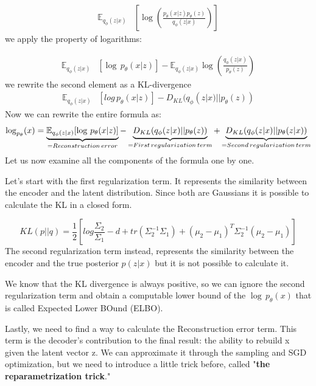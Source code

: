\begin{align*}
\mathbb{E}_{q_\phi (z|x)} & \left[ \log \left( \frac{p_\theta(x|z)p_\theta(z)}{q_\phi(z|x)} \right)\right]
\end{align*}
we apply the property of logarithms:

\begin{align*}
\mathbb{E}_{q_\phi (z|x)} & \left[ \log\,p_\theta(x|z) \right] -  \mathbb{E}_{q_\phi (z|x)} \log \left ( \frac{q_\phi(z|x)}{p_\theta(z)}   \right)
\end{align*}
we rewrite the second element as a KL-divergence
\begin{align*}
\mathbb{E}_{q_\phi (z|x)} & \left[ log\,p_\theta(x|z) \right] - D_{KL}(q_\phi(z|x)||p_\theta(z))
\end{align*}
Now we can rewrite the entire formula as:
\begin{equation*}
\log_{p_\theta}(x) = \underbrace{\mathbb{E}_{q_\phi(z|x)}[\log \, p_\theta(x|z)]}_{\text=Reconstruction \, error} - \underbrace{D_{KL}(q_\phi(z|x)||p_\theta(z))}_{\text=First \, regularization \, term} + \underbrace{D_{KL}(q_\phi(z|x)||p_\theta(z|x))}_{\text=Second \, regularization \, term}
\end{equation*}
Let us now examine all the components of the formula one by one.

Let's start with the first regularization term. 
It represents the similarity between the encoder and the latent distribution. 
Since both are Gaussians it is possible to calculate the KL in a closed form.

\begin{equation*}
KL(p||q) = \frac{1}{2} \left[ log \frac{\Sigma_2}{\Sigma_1} -d + tr(\Sigma_{2}^{-1}\Sigma_1) + (\mu_2 - \mu_1)^T \Sigma_{2}^{-1} (\mu_2 - \mu_1)\right]
\end{equation*}
The second regularization term instead, represents the similarity between the encoder and the true posterior $p(z|x)$ but it is not possible to calculate it.

We know that the KL divergence is always positive, so we can ignore the second regularization term and obtain a computable lower bound of the $\log\,p_\theta(x)$  that is called Expected Lower BOund (ELBO). 

Lastly, we need to find a way to calculate the Reconstruction error term.
This term is the decoder's contribution to the final result: the ability to rebuild x given the latent vector z.
We can approximate it through the sampling and SGD optimization, but we need to introduce a little trick before, called "\textbf{the reparametrization trick}."


